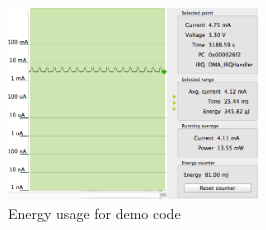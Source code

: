 \begin{figure}[H]
    \centering
    \includegraphics[width=250px]{figures/sw/preamp.png}
    \caption{Energy usage for demo code}
    \label{fig:preamp}
\end{figure}
